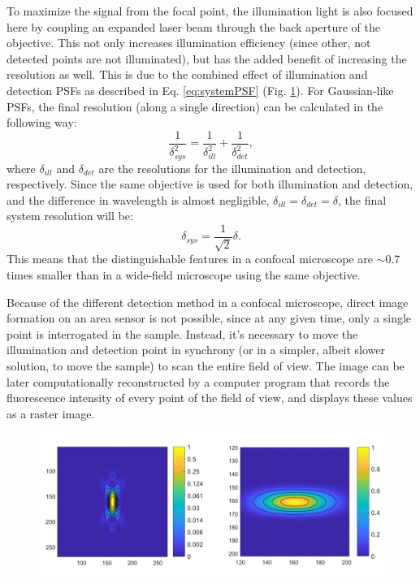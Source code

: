     To maximize the signal from the focal point, the illumination light is also focused here by coupling an expanded laser beam through the back aperture of the objective. This not only increases illumination efficiency (since other, not detected points are not illuminated), but has the added benefit of increasing the resolution as well. This is due to the combined effect of illumination and detection PSFs as described in Eq. \ref{eq:systemPSF} (Fig. \ref{fig:psf-confocal}). For Gaussian-like PSFs, the final resolution (along a single direction) can be calculated in the following way:
    \begin{equation}
      \frac{1}{\delta _{sys}^2} = \frac{1}{\delta _{ill}^2} + \frac{1}{\delta _{det}^2},
      \label{eq:systemRes}
    \end{equation}
    where $\delta_{ill}$ and $\delta_{det}$ are the resolutions for the illumination and detection, respectively. Since the same objective is used for both illumination and detection, and the difference in wavelength is almost negligible, $\delta_{ill} = \delta_{det} = \delta$, the final system resolution will be:
    \begin{equation}
      \delta_{sys} = \frac{1}{\sqrt{2}} \delta.
    \end{equation}
    This means that the distinguishable features in a confocal microscope are $\sim$0.7 times smaller than in a wide-field microscope using the same objective.

    Because of the different detection method in a confocal microscope, direct image formation on an area sensor is not possible, since at any given time, only a single point is interrogated in the sample. Instead, it's necessary to move the illumination and detection point in synchrony (or in a simpler, albeit slower solution, to move the sample) to scan the entire field of view. The image can be later computationally reconstructed by a computer program that records the fluorescence intensity of every point of the field of view, and displays these values as a raster image.


    \begin{figure}
      \centering
      \includegraphics[width=1\textwidth]{psfs/confocal.pdf}
      \label{fig:psf-confocal}
    \end{figure}


